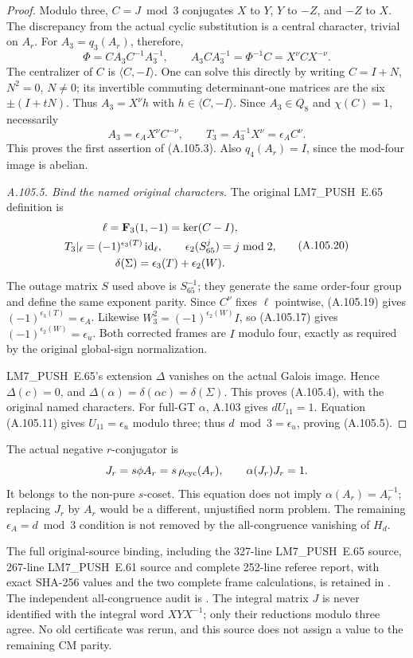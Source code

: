 \begin{proof}
Modulo three, \(C=J\bmod3\) conjugates \(X\) to \(Y\), \(Y\)
to \(-Z\), and \(-Z\) to \(X\). The discrepancy from the actual
cyclic substitution is a central character, trivial on \(A_r\).
For \(A_3=q_3(A_r)\), therefore,
\[
 \Phi=CA_3C^{-1}A_3^{-1},\qquad
 A_3CA_3^{-1}=\Phi^{-1}C=X^\nu CX^{-\nu}.
\tag{A.105.18}
\]
The centralizer of \(C\) is
\(\langle C,-I\rangle\). One can solve this directly by
writing \(C=I+N\), \(N^2=0\), \(N\ne0\); its invertible
commuting determinant-one matrices are the six
\(\pm(I+tN)\). Thus \(A_3=X^\nu h\) with
\(h\in\langle C,-I\rangle\). Since \(A_3\in Q_8\) and
\(\chi(C)=1\), necessarily
\[
 A_3=\epsilon_A X^\nu C^{-\nu},\qquad
 T_3=A_3^{-1}X^\nu=\epsilon_A C^\nu.
\tag{A.105.19}
\]
This proves the first assertion of (A.105.3).
Also \(q_4(A_r)=I\), since the mod-four image is abelian.

\emph{A.105.5. Bind the named original characters.}
The original LM7\_PUSH~E.65 definition is
\[
\begin{gathered}
 \ell=\mathbf F_3(1,-1)=\ker(C-I),\\
 T_3|_\ell=(-1)^{\epsilon_3(T)}\,{\rm id}_\ell,\qquad
 \epsilon_2(S_{65}^j)=j\bmod2,\\
 \delta(\Sigma)=\epsilon_3(T)+\epsilon_2(W).
\end{gathered}
\tag{A.105.20}
\]
The outage matrix \(S\) used above is \(S_{65}^{-1}\); they
generate the same order-four group and define the same exponent
parity. Since \(C^\nu\) fixes \(\ell\) pointwise, (A.105.19)
gives \((-1)^{\epsilon_3(T)}=\epsilon_A\). Likewise
\(W_3^2=(-1)^{\epsilon_2(W)}I\), so (A.105.17) gives
\((-1)^{\epsilon_2(W)}=\epsilon_u\). Both corrected frames
are \(I\) modulo four, exactly as required by the original
global-sign normalization.

LM7\_PUSH~E.65's extension \(\Delta\) vanishes on the actual Galois
image. Hence \(\Delta(c)=0\), and
\(\Delta(\alpha)=\delta(\alpha c)=\delta(\Sigma)\).
This proves (A.105.4), with the original named characters.
For full-GT \(\alpha\), A.103 gives \(dU_{11}=1\).
Equation (A.105.11) gives \(U_{11}=\epsilon_u\) modulo three;
thus \(d\bmod3=\epsilon_u\), proving (A.105.5).
\end{proof}

The actual negative \(r\)-conjugator is
\[
 J_r=s\phi A_r=s\,\rho_{\rm cyc}(A_r),\qquad
 \alpha(J_r)J_r=1.
\]
It belongs to the non-pure \(s\)-coset. This equation does not
imply \(\alpha(A_r)=A_r^{-1}\); replacing \(J_r\) by \(A_r\)
would be a different, unjustified norm problem. The remaining
\(\epsilon_A=d\bmod3\) condition is not removed by the
all-congruence vanishing of \(H_d\).

{\small\raggedright
The full original-source binding, including the 327-line LM7\_PUSH~E.65
source, 267-line LM7\_PUSH~E.61 source and complete 252-line referee report,
with exact SHA-256 values and the two complete frame calculations,
is retained in
.
The independent all-congruence audit is
.
The integral matrix \(J\) is never identified with the integral
word \(XYX^{-1}\); only their reductions modulo three agree.
No old certificate was rerun, and this source does not assign a
value to the remaining CM parity.\par}
